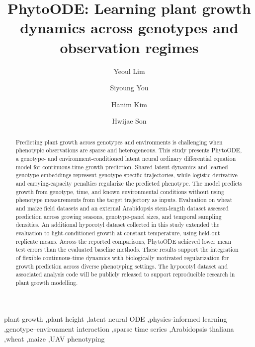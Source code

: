 \documentclass[preprint,12pt,authoryear]{elsarticle}
\newcommand{\model}{PhytoODE}
\newcommand{\todo}[1]{#1}
\begin{document}
\begin{frontmatter}

\title{PhytoODE: Learning plant growth dynamics across genotypes and observation regimes}

\author[inst1]{Yeoul Lim}
\author[inst1]{Siyoung You}
\author[inst2]{Hanim Kim}
\author[inst1]{Hwijae Son}

\address[inst1]{\todo{Department of Mathematics, Konkuk University, Seoul, Republic of Korea}}
\address[inst2]{\todo{Department of Chemistry, Seoul National University, Seoul, Republic of Korea}}

\begin{abstract}
Predicting plant growth across genotypes and environments is challenging when phenotypic observations are sparse and heterogeneous. This study presents \model{}, a genotype- and environment-conditioned latent neural ordinary differential equation model for continuous-time growth prediction. Shared latent dynamics and learned genotype embeddings represent genotype-specific trajectories, while logistic derivative and carrying-capacity penalties regularize the predicted phenotype. The model predicts growth from genotype, time, and known environmental conditions without using phenotype measurements from the target trajectory as inputs. Evaluation on wheat and maize field datasets and an external Arabidopsis stem-length dataset assessed prediction across growing seasons, genotype-panel sizes, and temporal sampling densities. An additional hypocotyl dataset collected in this study extended the evaluation to light-conditioned growth at constant temperature, using held-out replicate means. Across the reported comparisons, PhytoODE achieved lower mean test errors than the evaluated baseline methods. These results support the integration of flexible continuous-time dynamics with biologically motivated regularization for growth prediction across diverse phenotyping settings. The hypocotyl dataset and associated analysis code will be publicly released to support reproducible research in plant growth modelling.
\end{abstract}

\begin{keyword}
plant growth \sep plant height \sep latent neural ODE \sep physics-informed learning \sep genotype--environment interaction \sep sparse time series \sep Arabidopsis thaliana \sep wheat \sep maize \sep UAV phenotyping
\end{keyword}

\end{frontmatter}
\end{document}
